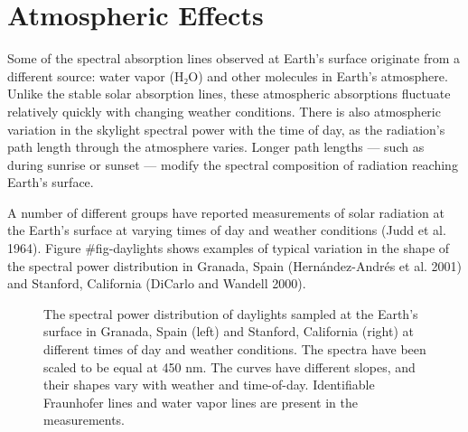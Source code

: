 \documentclass[
  letterpaper,
]{book}
\begin{document}
\section{Atmospheric Effects}\label{atmospheric-effects}

Some of the spectral absorption lines observed at Earth's surface
originate from a different source: water vapor (H₂O) and other molecules
in Earth's atmosphere. Unlike the stable solar absorption lines, these
atmospheric absorptions fluctuate relatively quickly with changing
weather conditions. There is also atmospheric variation in the skylight
spectral power with the time of day, as the radiation's path length
through the atmosphere varies. Longer path lengths --- such as during
sunrise or sunset --- modify the spectral composition of radiation
reaching Earth's surface.

A number of different groups have reported measurements of solar
radiation at the Earth's surface at varying times of day and weather
conditions (Judd et al. 1964). Figure \#fig-daylights shows examples of
typical variation in the shape of the spectral power distribution in
Granada, Spain (Hernández-Andrés et al. 2001) and Stanford, California
(DiCarlo and Wandell 2000).

\begin{figure}


\caption{\label{fig-daylights}The spectral power distribution of
daylights sampled at the Earth's surface in Granada, Spain (left) and
Stanford, California (right) at different times of day and weather
conditions. The spectra have been scaled to be equal at 450 nm. The
curves have different slopes, and their shapes vary with weather and
time-of-day. Identifiable Fraunhofer lines and water vapor lines are
present in the measurements.}

\end{figure}%
\end{document}
